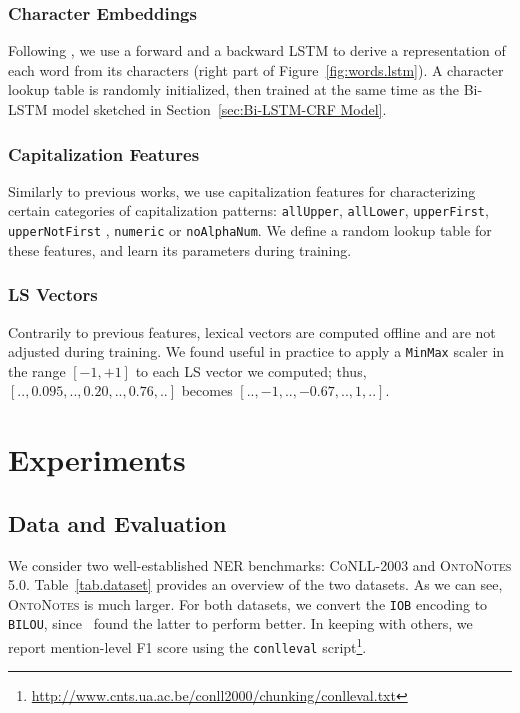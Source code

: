 \documentclass[11pt]{article}
\newcommand{\conll}{\textsc{CoNLL}}
\newcommand{\onto}{\textsc{OntoNotes}}
\newcommand{\lr}{\textsc{LS}}
\begin{document}
	
	\subsubsection{Character Embeddings}
	\label{sec:Chars}
	
	
	Following  \cite{lample2016neural}, we use a forward and a backward LSTM to derive a representation of each word from its characters (right part of Figure~\ref{fig:words.lstm}). A character lookup table is randomly initialized, then trained at the same time as the Bi-LSTM model sketched  in Section~\ref{sec:Bi-LSTM-CRF Model}.
	
	\subsubsection{Capitalization Features}
	\label{sec:Caps}
	
	Similarly to previous works, we use capitalization features for characterizing certain categories of capitalization patterns: \texttt{allUpper}, \texttt{allLower}, \texttt{upperFirst}, \texttt{upperNotFirst} , \texttt{numeric} or \texttt{noAlphaNum}. We define a random lookup table for these features, and learn its parameters during training.
	
	\subsubsection{\lr{} Vectors}
	
	Contrarily to previous features, lexical vectors are computed offline and are not adjusted during training. 
	We found useful in practice to apply a \texttt{MinMax} scaler in the range $[-1,+1]$ to each \lr{} vector we computed; thus, $[.., 0.095, .., 0.20,.., 0.76,..]$  becomes $[..,-1,..,-0.67,..,1,..]$.
	
	\section{Experiments}
	\label{sec:Experiments}

	\subsection{Data and Evaluation}
	\label{sec:Datasets}
	
	We consider two well-established NER benchmarks: \conll{-2003} and \onto{ 5.0}. Table~\ref{tab.dataset} provides an overview of the two datasets. As we can see, \onto{} is much larger. 
	For both datasets, we convert the \texttt{IOB} encoding to \texttt{BILOU}, since~ found the latter to perform better. In keeping with others, we report mention-level F1 score using the \texttt{conlleval} script\footnote{\url{http://www.cnts.ua.ac.be/conll2000/chunking/conlleval.txt}}.
	
\end{document}
